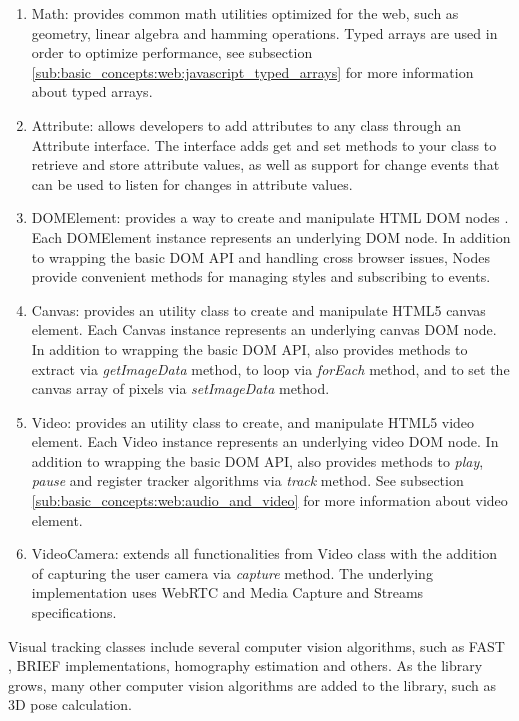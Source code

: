 \begin{enumerate}
  \item Math: provides common math utilities optimized for the web, such as geometry, linear algebra \cite{Hartley2004} and hamming operations. Typed arrays are used in order to optimize performance, see subsection \ref{sub:basic_concepts:web:javascript_typed_arrays} for more information about typed arrays.
  \item Attribute: allows developers to add attributes to any class through an Attribute interface. The interface adds get and set methods to your class to retrieve and store attribute values, as well as support for change events that can be used to listen for changes in attribute values.
  \item DOMElement: provides a way to create and manipulate HTML DOM nodes \cite{WC2006}. Each DOMElement instance represents an underlying DOM node. In addition to wrapping the basic DOM API and handling cross browser issues, Nodes provide convenient methods for managing styles and subscribing to events.
  \item Canvas: provides an utility class to create and manipulate HTML5 canvas element. Each Canvas instance represents an underlying canvas DOM node. In addition to wrapping the basic DOM API, also provides methods to extract via \textit{getImageData} method, to loop via \textit{forEach} method, and to set the canvas array of pixels via \textit{setImageData} method.
  \item Video: provides an utility class to create, and manipulate HTML5 video element. Each Video instance represents an underlying video DOM node. In addition to wrapping the basic DOM API, also provides methods to \textit{play}, \textit{pause} and register tracker algorithms via \textit{track} method. See subsection \ref{sub:basic_concepts:web:audio_and_video} for more information about video element.
  \item VideoCamera: extends all functionalities from Video class with the addition of capturing the user camera via \textit{capture} method. The underlying implementation uses WebRTC \cite{WebRTC2013} and Media Capture and Streams \cite{MediaCapture2013} specifications.
\end{enumerate}

Visual tracking classes include several computer vision algorithms, such as FAST \cite{RostenFaster2010}, BRIEF \cite{Calonder2010} implementations, homography estimation and others. As the library grows, many other computer vision algorithms are added to the library, such as 3D pose calculation.

